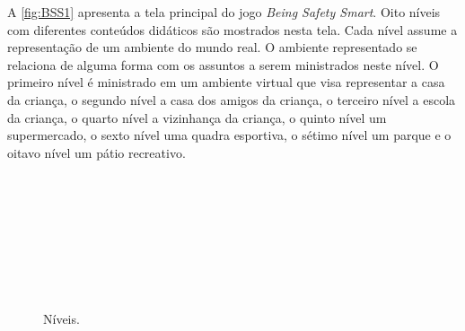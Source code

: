 A \autoref{fig:BSS1} apresenta a tela principal do jogo \textit{Being Safety Smart}. Oito níveis com diferentes conteúdos didáticos são mostrados nesta tela. Cada nível assume a representação de um ambiente do mundo real. O ambiente representado se relaciona de alguma forma com os assuntos a serem ministrados neste nível. O primeiro nível é ministrado em um ambiente virtual que visa representar a casa da criança, o segundo nível a casa dos amigos da criança, o terceiro nível a escola da criança, o quarto nível a vizinhança da criança, o quinto nível um supermercado, o sexto nível uma quadra esportiva, o sétimo nível um parque e o oitavo nível um pátio recreativo.

\begin{figure}%
  \vspace{-5pt}
  \caption{\label{fig:NiveisBBS}Níveis.\vspace{5pt}}

  \vspace{-3pt}
  \\
  \vspace{-3pt}
  \\
  \vspace{-3pt}
  \\
  \vspace{-3pt}
  \\
  \vspace{-3pt}
  \\
  \vspace{-3pt}
  \\
  \vspace{-3pt}
  \\
  \vspace{-8pt}
\end{figure}

